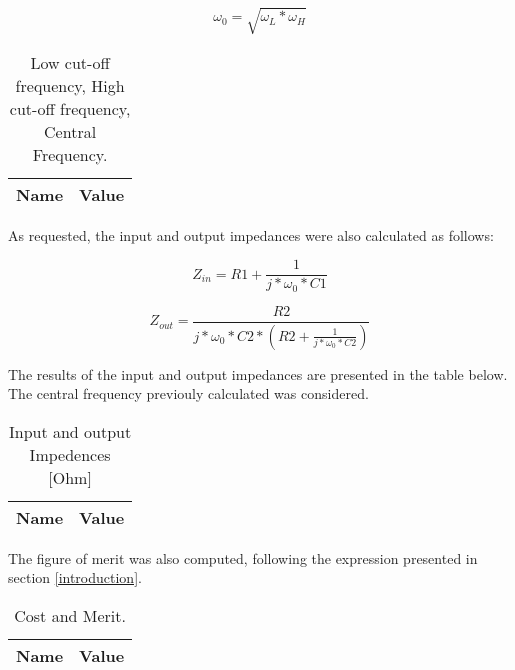 \begin{equation}
\omega_{0}= \sqrt{\omega_{L} * \omega_{H}}
\end{equation}



\begin{table}[ht]
  \centering
  \begin{tabular}{|l|r|}
    \hline    
    {\bf Name} & {\bf Value} \\ \hline
    
  \end{tabular}
  \caption{Low cut-off frequency, High cut-off frequency, Central Frequency.}
\end{table}


As requested, the input and output impedances were also calculated as follows:

\begin{equation}
Z_{in}= R1+ \frac{1}{j*\omega_{0}*C1} 
\end{equation}

\begin{equation}
Z_{out}= \frac{R2}{j*\omega_{0}*C2*(R2+\frac{1}{j*\omega_{0}*C2})} 
\end{equation}

The results of the input and output impedances are presented in the table below. The central frequency previouly calculated was considered.

\begin{table}[ht]
  \centering
  \begin{tabular}{|l|r|}
    \hline    
    {\bf Name} & {\bf Value} \\ \hline
    
  \end{tabular}
  \caption{Input and output Impedences [Ohm]}
  \label{tab:2}
\end{table}


The figure of merit was also computed, following the expression presented in section \ref{introduction}.

\begin{table}[ht]
  \centering
  \begin{tabular}{|l|r|}
    \hline    
    {\bf Name} & {\bf Value} \\ \hline
    
  \end{tabular}
  \caption{Cost and Merit.}
\end{table}



